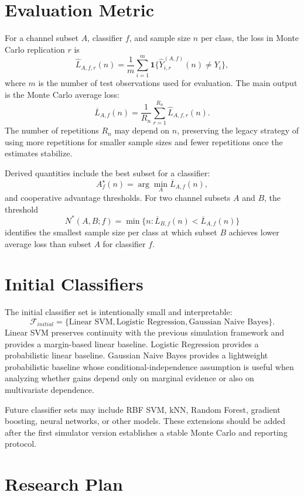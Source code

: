 \documentclass[11pt,a4paper]{article}
\begin{document}
\section{Evaluation Metric}

For a channel subset $A$, classifier $f$, and sample size $n$ per class, the loss in Monte Carlo replication $r$ is
\[
    \widehat{L}_{A,f,r}(n)
    =
    \frac{1}{m}\sum_{i=1}^{m}
    \mathbf{1}\{\widehat{Y}^{(A,f)}_{i,r}(n)\neq Y_i\},
\]
where $m$ is the number of test observations used for evaluation. The main output is the Monte Carlo average loss:
\[
    \overline{L}_{A,f}(n)
    =
    \frac{1}{R_n}\sum_{r=1}^{R_n}
    \widehat{L}_{A,f,r}(n).
\]
The number of repetitions $R_n$ may depend on $n$, preserving the legacy strategy of using more repetitions for smaller sample sizes and fewer repetitions once the estimates stabilize.

Derived quantities include the best subset for a classifier:
\[
    A_f^\star(n)=\arg\min_A \overline{L}_{A,f}(n),
\]
and cooperative advantage thresholds. For two channel subsets $A$ and $B$, the threshold
\[
    N^*(A,B;f)=\min\{n:\overline{L}_{B,f}(n)<\overline{L}_{A,f}(n)\}
\]
identifies the smallest sample size per class at which subset $B$ achieves lower average loss than subset $A$ for classifier $f$.

\section{Initial Classifiers}

The initial classifier set is intentionally small and interpretable:
\[
    \mathcal{F}_{initial}=\{\text{Linear SVM},\text{Logistic Regression},\text{Gaussian Naive Bayes}\}.
\]
Linear SVM preserves continuity with the previous simulation framework and provides a margin-based linear baseline. Logistic Regression provides a probabilistic linear baseline. Gaussian Naive Bayes provides a lightweight probabilistic baseline whose conditional-independence assumption is useful when analyzing whether gains depend only on marginal evidence or also on multivariate dependence.

Future classifier sets may include RBF SVM, kNN, Random Forest, gradient boosting, neural networks, or other models. These extensions should be added after the first simulator version establishes a stable Monte Carlo and reporting protocol.

\section{Research Plan}
\end{document}
